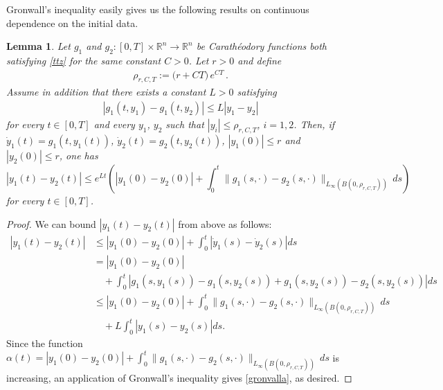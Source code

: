 \documentclass[A4paper,11pt]{article}
\newtheorem{lemma}[theorem]{Lemma}
\theoremstyle{definition}
\newcommand{\R}{\mathbb{R}}
\begin{document}
Gronwall's inequality easily gives us the following results on continuous dependence on the initial data.

\begin{lemma}\label{le:uniquecara}
Let $g_1$ and $g_2\colon[0,T]\times \R^n \to \R^n$ be Carath{\'e}odory functions both satisfying \eqref{ttz} for the same  constant $C > 0$. Let $r>0$ and define 
\begin{align*}
\rho_{r, C, T}:=\Big(r+ CT\Big) \,e^{CT}\,.
\end{align*}
Assume in addition that there exists a constant $L > 0$ satisfying
\begin{align*}
|g_1(t, y_1)-g_1(t, y_2)|\le L|y_1-y_2|
\end{align*}
for every $t \in [0, T]$ and every $y_1$, $y_2$ such that $|y_i|\le \rho_{r, C, T}$, $i=1,2$.
Then, if $\dot y_1(t)=g_1(t, y_1(t))$, $\dot y_2(t)=g_2(t, y_2(t))$, $|y_1(0)|\le r$ and $|y_2(0)|\le r$, one has
\begin{equation}\label{gronvalla}
|y_1(t)-y_2(t)|\le e^{Lt}\left(|y_1(0)-y_2(0)|+\int_0^t \|g_1(s, \cdot)-g_2(s, \cdot)\|_{L_\infty(B(0, \rho_{r, C, T}))} \,ds \right)
\end{equation}
for every $t \in [0, T]$.
\end{lemma}
\begin{proof}
We can bound $|y_1(t) - y_2(t)|$ from above as follows:
\begin{align*}
|y_1(t) - y_2(t)| &\leq |y_1(0) - y_2(0)| + \int^t_0 |\dot{y}_1(s) - \dot{y}_2(s)| ds \\
&= |y_1(0) - y_2(0)| \\
& \quad + \int^t_0 |g_1(s, y_1(s)) - g_1(s, y_2(s)) + g_1(s, y_2(s)) - g_2(s, y_2(s))| ds \\
& \leq |y_1(0) - y_2(0)| + \int_0^t \|g_1(s, \cdot)-g_2(s, \cdot)\|_{L_\infty(B(0, \rho_{r, C, T}))} \,ds \\
& \quad  + L \int^t_0|y_1(s) - y_2(s)| ds.
\end{align*}
Since the function $\alpha(t) = |y_1(0) - y_2(0)| + \int_0^t \|g_1(s, \cdot)-g_2(s, \cdot)\|_{L_\infty(B(0, \rho_{r, C, T}))} \,ds$ is increasing, an application of Gronwall's inequality gives \eqref{gronvalla}, as desired.
\end{proof}
\end{document}

